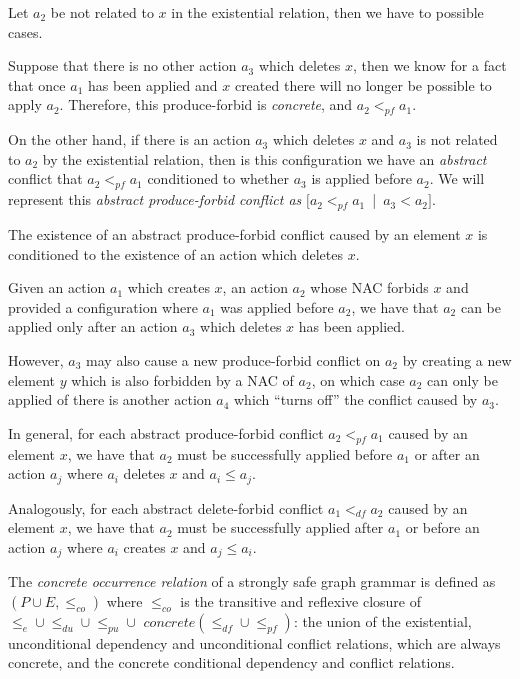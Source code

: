 \begin{definition}
\begin{description}[style=nextline]
  \item[Unrelated element:]
    Let $a_2$ be not related to $x$ in the existential relation, then we have to possible cases.
    
    Suppose that there is no other action $a_3$ which deletes $x$, then we know for a fact that once $a_1$ has been applied and $x$ created there will no longer be possible to apply $a_2$. Therefore, this produce-forbid is \emph{concrete}, and $a_2 <_{pf} a_1$.

    On the other hand, if there is an action $a_3$ which deletes $x$ and $a_3$ is not related to $a_2$ by the existential relation, then is this configuration we have an \emph{abstract} conflict that $a_2 <_{pf} a_1$ conditioned to whether $a_3$ is applied before $a_2$. We will represent this \emph{abstract produce-forbid conflict as} \mbox{$[a_2 <_{pf} a_1$ | $a_3 < a_2]$}.
\end{description}
\end{definition}

\begin{remark} The existence of an abstract produce-forbid conflict caused by an element $x$ is conditioned to the existence of an action which deletes $x$.

  Given an action $a_1$ which creates $x$, an action $a_2$ whose NAC forbids $x$ and provided a configuration where $a_1$ was applied before $a_2$, we have that $a_2$ can be applied only after an action $a_3$ which deletes $x$ has been applied.

  However, $a_3$ may also cause a new produce-forbid conflict on $a_2$ by creating a new element $y$ which is also forbidden by a NAC of $a_2$, on which case $a_2$ can only be applied of there is another action $a_4$ which ``turns off'' the conflict caused by $a_3$.

  In general, for each abstract produce-forbid conflict $a_2 <_{pf} a_1$ caused by an element $x$, we have that $a_2$ must be successfully applied before $a_1$ or after an action $a_{j}$ where $a_i$ deletes $x$ and $a_i \leq a_j$.

  Analogously, for each abstract delete-forbid conflict $a_1 <_{df} a_2$ caused by an element $x$, we have that $a_2$ must be successfully applied after $a_1$ or before an action $a_j$ where $a_i$ creates $x$ and $a_j \leq a_i$.
\end{remark}

\begin{definition} The \emph{concrete occurrence relation} of a strongly safe graph grammar is defined as $(P \cup E, \leq_{co})$ where $\leq_{co}$ is the transitive and reflexive closure of $\leq_{e} \cup \leq_{du} \cup \leq_{pu} \cup$  $concrete(\leq_{df} \cup \leq_{pf})$: the union of the existential, unconditional dependency and unconditional conflict relations, which are always concrete, and the concrete conditional dependency and conflict relations.
\end{definition}

